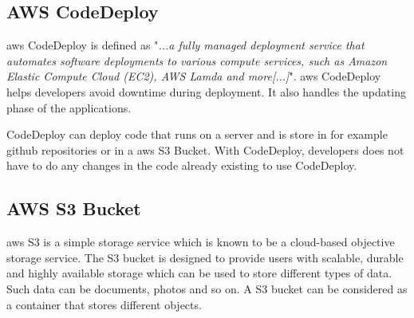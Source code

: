 \subsection{AWS CodeDeploy}
\acrshort{aws} CodeDeploy is defined as "\textit{...a fully managed deployment service that automates software deployments to various compute services, such as Amazon Elastic Compute Cloud (EC2), AWS Lamda and more[...]}"\cite{AWSCodeDeploy}.
\acrshort{aws} CodeDeploy helps developers avoid downtime during deployment. It also handles the updating phase of the applications. 

CodeDeploy can deploy code that runs on a server and is store in for example github repositories or in a \acrshort{aws} S3 Bucket. With CodeDeploy, developers does not have to do any changes in the code already existing to use CodeDeploy. \cite{CodeDeploy1}

\subsection{AWS S3 Bucket}
\acrshort{aws} S3 is a simple storage service which is known to be a cloud-based objective storage service. The S3 bucket is designed to provide users with scalable, durable and highly available storage which can be used to store different types of data. Such data can be documents, photos and so on. 
A S3 bucket can be considered as a container that stores different objects. \cite{S3Bucket}